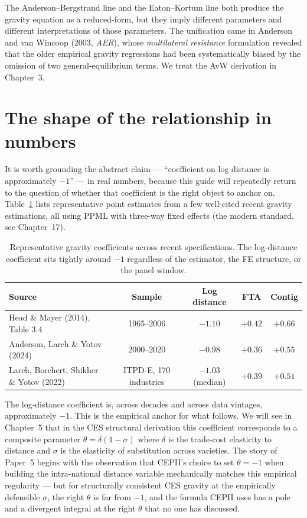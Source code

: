 \documentclass[11pt,letterpaper,oneside]{book}
\theoremstyle{definition}
\theoremstyle{remark}
\begin{document}
The Anderson--Bergstrand line and the Eaton--Kortum line both produce the gravity equation as a reduced-form, but they imply different parameters and different interpretations of those parameters. The unification came in Anderson and van Wincoop (2003, \emph{AER}), whose \emph{multilateral resistance} formulation revealed that the older empirical gravity regressions had been systematically biased by the omission of two general-equilibrium terms. We treat the AvW derivation in Chapter~3.

\section{The shape of the relationship in numbers}

It is worth grounding the abstract claim --- ``coefficient on log distance is approximately $-1$'' --- in real numbers, because this guide will repeatedly return to the question of whether that coefficient is the right object to anchor on. Table~\ref{tab:gravity-stylized} lists representative point estimates from a few well-cited recent gravity estimations, all using PPML with three-way fixed effects (the modern standard, see Chapter~17).

\begin{table}[h]
\centering
\small
\begin{tabular}{lcccc}
\toprule
Source & Sample & Log distance & FTA & Contig \\
\midrule
Head \& Mayer (2014), Table 3.4 & 1965--2006 & $-1.10$ & $+0.42$ & $+0.66$ \\
Anderson, Larch \& Yotov (2024) & 2000--2020 & $-0.98$ & $+0.36$ & $+0.55$ \\
Larch, Borchert, Shikher \& Yotov (2022) & ITPD-E, 170 industries & $-1.03$ (median) & $+0.39$ & $+0.51$ \\
\bottomrule
\end{tabular}
\caption{Representative gravity coefficients across recent specifications. The log-distance coefficient sits tightly around $-1$ regardless of the estimator, the FE structure, or the panel window.}
\label{tab:gravity-stylized}
\end{table}

The log-distance coefficient is, across decades and across data vintages, approximately $-1$. This is the empirical anchor for what follows. We will see in Chapter~5 that in the CES structural derivation this coefficient corresponds to a composite parameter $\theta = \delta(1-\sigma)$ where $\delta$ is the trade-cost elasticity to distance and $\sigma$ is the elasticity of substitution across varieties. The story of Paper~5 begins with the observation that CEPII's choice to set $\theta = -1$ when building the intra-national distance variable mechanically matches this empirical regularity --- but for structurally consistent CES gravity at the empirically defensible $\sigma$, the right $\theta$ is far from $-1$, and the formula CEPII uses has a pole and a divergent integral at the right $\theta$ that no one has discussed.
\end{document}

